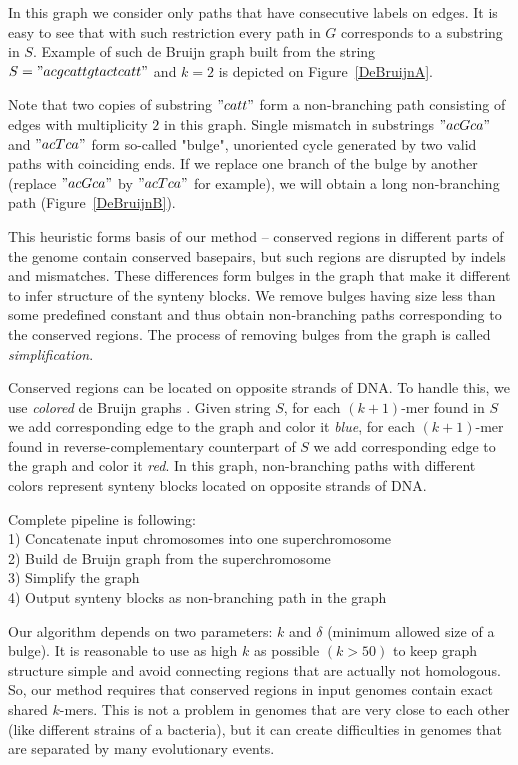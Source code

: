 \documentclass[a4paper,12pt]{scrartcl}
\begin{document}
In this graph we consider only paths that have consecutive labels on edges. It is easy to see that with such restriction every path in \(G\)
corresponds to a substring in \(S\). Example of such de Bruijn graph built from the string \(S = "acgcattgtactcatt" \) and \(k = 2\) is
depicted on Figure~\ref{DeBruijnA}.

Note that two copies of substring \("catt"\) form a non-branching path consisting of edges with multiplicity \(2\) in this graph. Single
mismatch in substrings \("acGca"\) and \("acTca"\) form so-called "bulge", unoriented cycle generated by two valid paths with
coinciding ends. If we replace one branch of the bulge by another (replace \("acGca"\) by \("acTca"\) for example), we will obtain
a long non-branching path (Figure~\ref{DeBruijnB}).

This heuristic forms basis of our method -- conserved regions in different parts of the genome contain conserved basepairs, but
such regions are disrupted by indels and mismatches. These differences form bulges in the graph that make it different to infer
structure of the synteny blocks. We remove bulges having size less than some predefined constant and thus obtain non-branching
paths corresponding to the conserved regions. The process of removing bulges from the graph is called \textit{simplification}.

Conserved regions can be located on opposite strands of DNA. To handle this, we use \textit{colored} de Bruijn graphs \cite{Iqbal2012}.
Given string \(S\), for each \((k + 1)\)-mer found in \(S\) we add corresponding edge to the graph and color it \textit{blue}, for 
each \((k + 1)\)-mer found in reverse-complementary counterpart of \(S\) we add corresponding edge to the graph and color it \textit{red}.
In this graph, non-branching paths with different colors represent synteny blocks located on opposite strands of DNA.

Complete pipeline is following:\\
1) Concatenate input chromosomes into one superchromosome \\
2) Build de Bruijn graph from the superchromosome \\
3) Simplify the graph \\
4) Output synteny blocks as non-branching path in the graph 

Our algorithm depends on two parameters: \(k\) and \(\delta\) (minimum allowed size of a bulge). It is reasonable to use as high \(k\) as possible
\((k > 50)\) to keep graph structure simple and avoid connecting regions that are actually not homologous. So, our method requires that conserved regions
in input genomes contain exact shared \(k\)-mers. This is not a problem in genomes that are very close to each other (like different strains of a bacteria),
but it can create difficulties in genomes that are separated by many evolutionary events.
\end{document}

